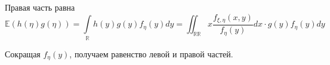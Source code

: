         Правая часть равна
        \begin{equation*}
            \mathbb{E}(h(\eta) g(\eta))=\int\limits_{\mathbb{R}} h(y) g(y) f_{\eta}(y) d y=\iint_{\mathbb{R} \mathbb{R}} x \frac{f_{\xi, \eta}(x, y)}{f_{\eta}(y)} d x \cdot g(y) f_{\eta}(y) d y
        \end{equation*}
        
        Сокращая $f_{\eta}(y)$, получаем равенство левой и правой частей.
\fi
